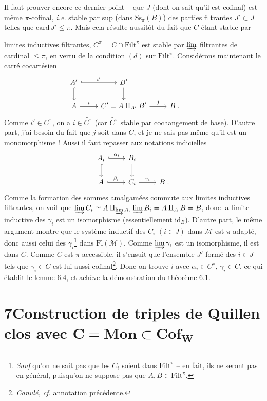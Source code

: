\documentclass[11pt]{article}
\newcommand{\msp}[1]{\marginpar{\raggedright\footnotesize [#1]}}
\newcommand{\Filt}{\mathrm{Filt}}
\newcommand{\Ss}{\mathrm{Ss}}
\newcommand{\M}{\mathcal{M}}
\newcommand{\Fl}{\mathrm{Fl}}
\begin{document}
Il faut prouver encore ce dernier point -- que $J$ (dont on sait qu'il est cofinal) est même $\pi$-cofinal, \textit{i.e.} stable par sup (dans $\Ss_{\pi}(B)$) des parties filtrantes $J' \subset J$ telles que $\mathrm{card}\, J' \leq \pi$. Mais cela résulte aussitôt du fait que $C$ étant stable par

\msp{page 83}
limites inductives filtrantes, $C^{\pi} = C \cap \Filt^{\pi}$ est stable par $\varinjlim$ filtrantes de cardinal $\leq \pi$, en vertu de la condition $(d)$ sur $\Filt^{\pi}$. Considérons maintenant le carré cocartésien
\[
\begin{tikzcd}
A' \arrow[r, hook, "i'"] \arrow[d, hook] & B' \arrow[d] & & \\
A \arrow[r, "i"] & C' = A \amalg_{A'} B' \arrow[r, "j"] & B \;.
\end{tikzcd}
\]
Comme $i' \in C^{\pi}$, on a $i \in \widetilde{C^{\pi}}$ (car $\widetilde{C^{\pi}}$ stable par cochangement de base). D'autre part, j'ai besoin du fait que $j$ soit dans $C$, et je ne sais pas même qu'il est un monomorphisme ! Aussi il faut repasser aux notations indicielles
\[
\begin{tikzcd}
A_i \arrow[r, hook, "\alpha_i"] \arrow[d, hook] & B_i \arrow[d] & \\
A \arrow[r, hook, "\beta_i"] & C_i \arrow[r, "\gamma_i"] & B \;.
\end{tikzcd}
\]
Comme la formation des sommes amalgamées commute aux limites inductives filtrantes, on voit que $\varinjlim C_i \simeq A \amalg_{\varinjlim A_i} \varinjlim B_i = A \amalg_A B = B$, donc la limite inductive des $\gamma_i$ est un isomorphisme (essentiellement $\mathrm{id}_B$). D'autre part, le même argument montre que le système inductif des $C_i$ $(i \in J)$ dans $\M$ est $\pi$-adapté, donc aussi celui des $\gamma_i$\footnote[28]{\textit{Sauf} qu'on ne sait pas que les $C_i$ soient dans $\Filt^{\pi}$ -- en fait, ils ne seront pas en général, puisqu'on ne suppose pas que $A, B \in \Filt^{\pi}$.}
\msp{page 84}
dans $\underline{\Fl}(\M)$. Comme $\varinjlim \gamma_i$ est un isomorphisme, il est dans $C$. Comme $C$ est $\pi$-accessible, il s'ensuit que l'ensemble $J'$ formé des $i \in J$ tels que $\gamma_i \in C$ est lui aussi cofinal\footnote[29]{\textit{Canulé, cf.} annotation précédente.}. Donc on trouve $i$ avec $\alpha_i \in C^{\pi}$, $\gamma_i \in C$, ce qui établit le lemme 6.4, et achève la démonstration du théorème 6.1.

\section*{7\quad Construction de triples de Quillen clos avec $\boldsymbol{C} = \mathbf{Mon} \subset \mathbf{Cof}_{\boldsymbol{W}}$}
\end{document}
